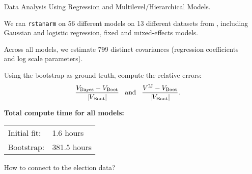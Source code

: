 \begin{frame}{Data Analysis Using Regression and Multilevel/Hierarchical Models.}

    \begin{minipage}{0.44\textwidth}
    
    We ran \texttt{rstanarm} on 56 different models on 13 different datasets
    from \citet{gelman:2006:arm},
    including Gaussian and logistic regression, fixed and mixed-effects models.
    
    \spskip Across all models, we estimate 799 distinct covariances (regression
    coefficients and log scale parameters).
    
    \spskip
    Using the bootstrap as ground truth, compute the relative errors:
    \begin{align*}
    \frac{V_{\mathrm{Bayes}} - V_{\mathrm{Boot}}}{|V_{\mathrm{Boot}}|}
    \,\,\,
    \textrm{ and }
    \,\,\,
    \frac{V^{\mathrm{IJ}} - V_{\mathrm{Boot}}}{|V_{\mathrm{Boot}}|}.
    \end{align*}
    \end{minipage}
    \hspace{1em}
    \begin{minipage}{0.44\textwidth}
        \ARMGraphDiff
        \textbf{Total compute time for all models:}
    
        \begin{tabular}{ll}
        Initial fit: & 1.6 hours \\
        Bootstrap: & 381.5 hours\\
        \end{tabular}
\end{minipage}

\end{frame}



\begin{frame}[c]{How to connect to the election data?}


\begin{minipage}{0.48\textwidth}
    \ElectionData{}
\end{minipage}
\begin{minipage}{0.48\textwidth}
    \ElectionResultsGlobal{}
\end{minipage}


\end{frame}